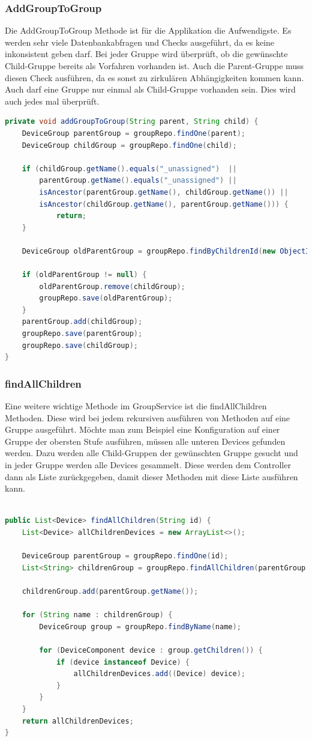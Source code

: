 \subsubsection{AddGroupToGroup}
Die AddGroupToGroup Methode ist für die Applikation die Aufwendigste. Es werden sehr viele Datenbankabfragen und Checks ausgeführt, da es keine inkonsistent geben darf. Bei jeder Gruppe wird überprüft, ob die gewünschte Child-Gruppe bereits als Vorfahren vorhanden ist. Auch die Parent-Gruppe muss diesen Check ausführen, da es sonst zu zirkulären Abhängigkeiten kommen kann. Auch darf eine Gruppe nur einmal als Child-Gruppe vorhanden sein. Dies wird auch jedes mal überprüft. 
\begin{lstlisting}[language=java]
private void addGroupToGroup(String parent, String child) {
	DeviceGroup parentGroup = groupRepo.findOne(parent);
	DeviceGroup childGroup = groupRepo.findOne(child);

	if (childGroup.getName().equals("_unassigned")  ||
		parentGroup.getName().equals("_unassigned") ||
		isAncestor(parentGroup.getName(), childGroup.getName()) ||
		isAncestor(childGroup.getName(), parentGroup.getName())) {
			return;
	}

	DeviceGroup oldParentGroup = groupRepo.findByChildrenId(new ObjectId(childGroup.getId()));
		
	if (oldParentGroup != null) {
		oldParentGroup.remove(childGroup);
		groupRepo.save(oldParentGroup);
	}
	parentGroup.add(childGroup);
	groupRepo.save(parentGroup);
	groupRepo.save(childGroup);
}
\end{lstlisting}

\subsubsection{findAllChildren}
Eine weitere wichtige Methode im GroupService ist die findAllChildren Methoden. Diese wird bei jedem rekursiven ausführen von Methoden auf eine Gruppe ausgeführt. Möchte man zum Beispiel eine Konfiguration auf einer Gruppe der obersten Stufe ausführen, müssen alle unteren Devices gefunden werden. Dazu werden alle Child-Gruppen der gewünschten Gruppe gesucht und in jeder Gruppe werden alle Devices gesammelt. Diese werden dem Controller dann als Liste zurückgegeben, damit dieser Methoden mit diese Liste ausführen kann. 

\begin{lstlisting}[language=java]

public List<Device> findAllChildren(String id) {
	List<Device> allChildrenDevices = new ArrayList<>();

	DeviceGroup parentGroup = groupRepo.findOne(id);
	List<String> childrenGroup = groupRepo.findAllChildren(parentGroup.getName());

	childrenGroup.add(parentGroup.getName());

	for (String name : childrenGroup) {
		DeviceGroup group = groupRepo.findByName(name);

		for (DeviceComponent device : group.getChildren()) {
			if (device instanceof Device) {
				allChildrenDevices.add((Device) device);
			}
		}
	}
	return allChildrenDevices;
}
\end{lstlisting}



